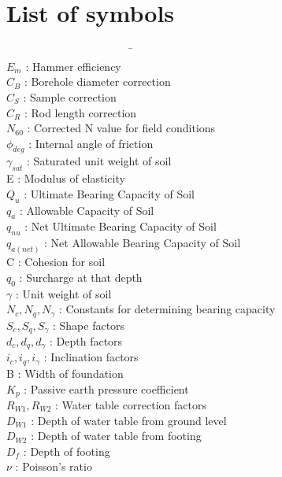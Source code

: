 \chapter*{List of symbols}
\begin{tabbing}
~~~~~~~~~~~~~~~~~~~~~~~\= ~~~~~~~~~~~~~~~~\= \\%
$E_m$ \> : \> Hammer efficiency\\
$C_B$ \> : \> Borehole diameter correction\\
$C_S$ \> : \> Sample correction\\
$C_R$ \> : \> Rod length correction\\
$N_{60}$ \> : \> Corrected N value for field conditions\\
${\phi}_{deg}$ \> : \> Internal angle of friction\\
${\gamma}_{sat}$ \> : \> Saturated unit weight of soil\\
E \> : \> Modulus of elasticity\\
$Q_u$ \> : \> Ultimate Bearing Capacity of Soil \\
$q_a$ \> : \> Allowable Capacity of Soil \\
$q_{nu}$ \> : \> Net Ultimate Bearing Capacity of Soil \\
$q_{a(net)}$ \> : \> Net Allowable Bearing Capacity of Soil \\
C \> : \> Cohesion for soil\\
$q_0$ \> : \> Surcharge at that depth\\
$\gamma$ \> : \> Unit weight of soil\\
$N_c, N_q, N_{\gamma}$ \> : \> Constants for determining bearing capacity\\
$S_c, S_q, S_{\gamma}$ \> : \> Shape factors\\
$d_c, d_q, d_{\gamma}$ \> : \> Depth factors\\
$i_c, i_q, i_{\gamma}$ \> : \> Inclination factors\\
B \> : \> Width of foundation\\
$K_p$ \> : \> Passive earth pressure coefficient\\
$R_{W1}, R_{W2}$ \> : \> Water table correction factors \\
$D_{W1}$ \> : \> Depth of water table from ground level \\
$D_{W2}$ \> : \> Depth of water table from footing \\
$D_f$ \> : \> Depth of footing \\
$\nu$ \> : \> Poisson's ratio \\

\end{tabbing}
